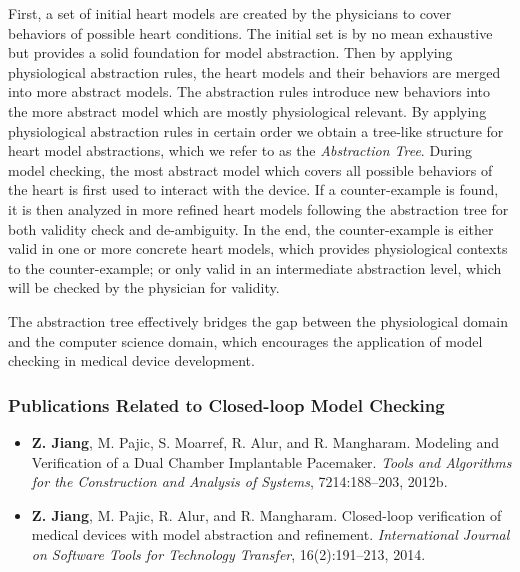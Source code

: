 \documentclass[a4paper,11pt]{article}
\begin{document}
First, a set of initial heart models are created by the physicians to cover behaviors of possible heart conditions.
The initial set is by no mean exhaustive but provides a solid foundation for model abstraction.
Then by applying physiological abstraction rules, the heart models and their behaviors are merged into more abstract models.
The abstraction rules introduce new behaviors into the more abstract model which are mostly physiological relevant.
By applying physiological abstraction rules in certain order we obtain a tree-like structure for heart model abstractions, which we refer to as the \emph{Abstraction Tree}.
During model checking, the most abstract model which covers all possible behaviors of the heart is first used to interact with the device.
If a counter-example is found, it is then analyzed in more refined heart models following the abstraction tree for both validity check and de-ambiguity.
In the end, the counter-example is either valid in one or more concrete heart models, which provides physiological contexts to the counter-example; or only valid in an intermediate abstraction level, which will be checked by the physician for validity.

The abstraction tree effectively bridges the gap between the physiological domain and the computer science domain, which encourages the application of model checking in medical device development.
\subsubsection{Publications Related to Closed-loop Model Checking}
\begin{itemize}
\item \textbf{Z. Jiang}, M. Pajic, S. Moarref, R. Alur, and R. Mangharam. Modeling and Verification of a Dual Chamber Implantable Pacemaker. \emph{Tools and Algorithms for the Construction and Analysis of Systems}, 7214:188–203, 2012b.
\item \textbf{Z. Jiang}, M. Pajic, R. Alur, and R. Mangharam. Closed-loop verification of medical devices with model abstraction and refinement. \emph{International Journal on Software Tools for Technology Transfer}, 16(2):191–213, 2014.
\end{itemize}
\end{document}
